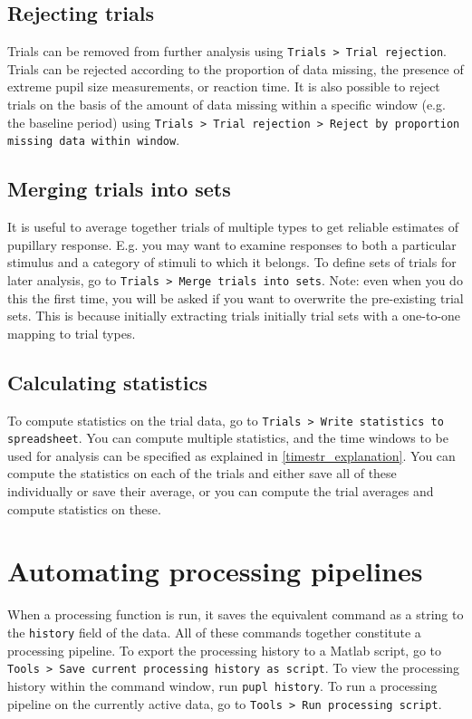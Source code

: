 \documentclass{article}
\newcommand{\erp}{Trials }
\begin{document}
\subsection{Rejecting trials}
Trials can be removed from further analysis using \texttt{\erp > Trial rejection}. Trials can be rejected according to the proportion of data missing, the presence of extreme pupil size measurements, or reaction time. It is also possible to reject trials on the basis of the amount of data missing within a specific window (e.g. the baseline period) using \texttt{\erp > Trial rejection > Reject by proportion missing data within window}.
\subsection{Merging trials into sets} \label{trialsets}
It is useful to average together trials of multiple types to get reliable estimates of pupillary response. E.g. you may want to examine responses to both a particular stimulus and a category of stimuli to which it belongs. To define sets of trials for later analysis, go to \texttt{\erp > Merge trials into sets}. Note: even when you do this the first time, you will be asked if you want to overwrite the pre-existing trial sets. This is because initially extracting trials initially trial sets with a one-to-one mapping to trial types.
\subsection{Calculating statistics}
To compute statistics on the trial data, go to \texttt{\erp > Write statistics to spreadsheet}. You can compute multiple statistics, and the time windows to be used for analysis can be specified as explained in \ref{timestr_explanation}. You can compute the statistics on each of the trials and either save all of these individually or save their average, or you can compute the trial averages and compute statistics on these.
\section{Automating processing pipelines}
When a processing function is run, it saves the equivalent command as a string to the \texttt{history} field of the data. All of these commands together constitute a processing pipeline. To export the processing history to a Matlab script, go to \texttt{Tools > Save current processing history as script}. To view the processing history within the command window, run \texttt{pupl history}. To run a processing pipeline on the currently active data, go to \texttt{Tools > Run processing script}.
\end{document}
